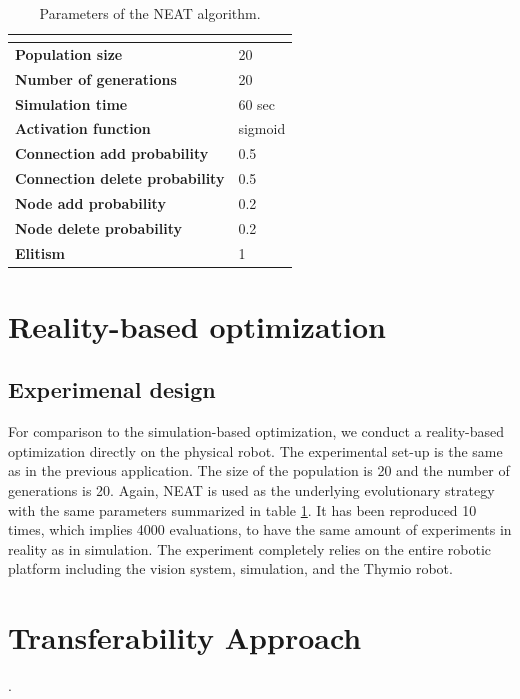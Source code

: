 \begin{table}[H]
\centering
\begin{tabular}{ll}
\hline
\textbf{}                      & \textbf{} \\ \hline
\textbf{Population size}       & 20        \\
\textbf{Number of generations} & 20        \\
\textbf{Simulation time}       & 60 sec    \\
\textbf{Activation function}             & sigmoid       \\
\textbf{Connection add probability}              & 0.5       \\
\textbf{Connection delete probability}              & 0.5       \\
\textbf{Node add probability}              & 0.2       \\
\textbf{Node delete probability}              & 0.2       \\
\textbf{Elitism}  & 1      
\end{tabular}
\caption{Parameters of the NEAT algorithm.}
\label{tab:neat_parameters}
\end{table}

\section{Reality-based optimization}

\subsection{Experimenal design}

For comparison to the simulation-based optimization, we conduct a reality-based optimization directly on the physical robot. The experimental set-up is the same as in the previous application. The size of the population is 20 and the number of generations is 20. Again, NEAT is used as the underlying evolutionary strategy with the same parameters summarized in table \ref{tab:neat_parameters}. It has been reproduced 10 times, which implies 4000 evaluations, to have the same amount of experiments in reality as in simulation. The experiment completely relies on the entire robotic platform including the vision system, simulation, and the Thymio robot.

\section{Transferability Approach}.

